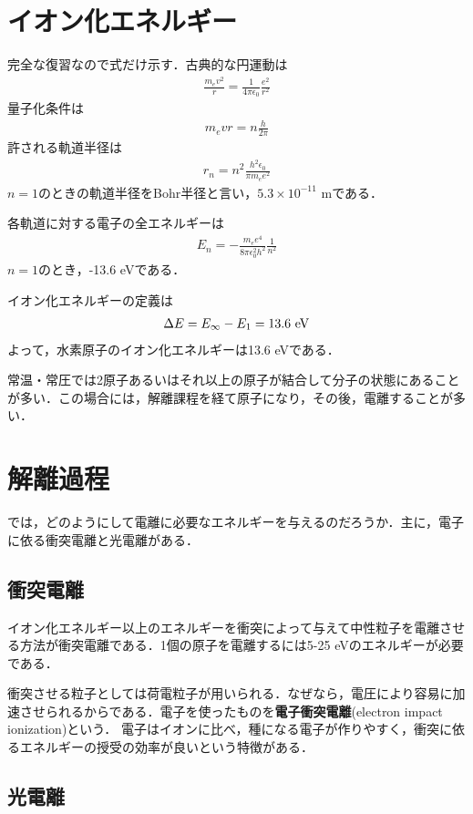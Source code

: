 \documentclass{report}
\begin{document}
\section{イオン化エネルギー}
完全な復習なので式だけ示す．古典的な円運動は
\begin{align}
  \frac{m_ev^2}{r} = \frac{1}{4\pi\epsilon_0}\frac{e^2}{r^2}
\end{align}
量子化条件は
\begin{align}
  m_e vr = n\frac{h}{2\pi}
\end{align}
許される軌道半径は
\begin{align}
  r_n = n^2 \frac{h^2\epsilon_0}{\pi m_e e^2}
\end{align}
$n=1$のときの軌道半径をBohr半径と言い，$5.3\times10^{-11}$ mである．

各軌道に対する電子の全エネルギーは
\begin{align}
  E_n = -\frac{m_ee^4}{8\pi\epsilon_0^2h^2}\frac{1}{n^2}
\end{align}
$n=1$のとき，-13.6 eVである．

イオン化エネルギーの定義は
\begin{align}
  \Delta E = E_{\infty} - E_1 = 13.6\ \mathrm{eV}
\end{align}
よって，水素原子のイオン化エネルギーは13.6 eVである．

常温・常圧では2原子あるいはそれ以上の原子が結合して分子の状態にあることが多い．この場合には，解離課程を経て原子になり，その後，電離することが多い．

\section{解離過程}
では，どのようにして電離に必要なエネルギーを与えるのだろうか．主に，電子に依る衝突電離と光電離がある．

\subsection{衝突電離}
イオン化エネルギー以上のエネルギーを衝突によって与えて中性粒子を電離させる方法が衝突電離である．1個の原子を電離するには5-25 eVのエネルギーが必要である．

衝突させる粒子としては荷電粒子が用いられる．なぜなら，電圧により容易に加速させられるからである．電子を使ったものを\textbf{電子衝突電離}(electron impact ionization)という．
電子はイオンに比べ，種になる電子が作りやすく，衝突に依るエネルギーの授受の効率が良いという特徴がある．


\subsection{光電離}
\end{document}
